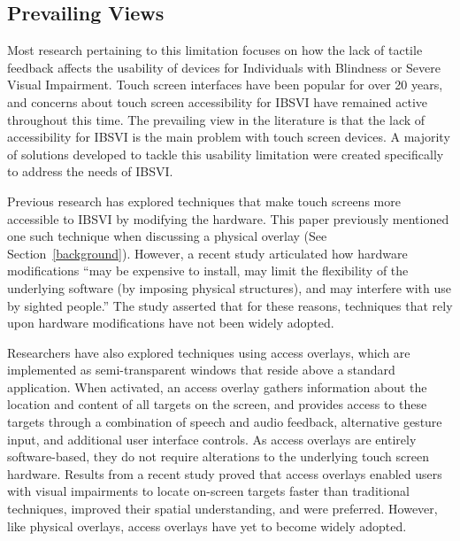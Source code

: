 \documentclass[11pt]{article}
\begin{document}
\subsection{Prevailing Views}
Most research pertaining to this limitation focuses on how the lack of tactile feedback affects the usability of devices for Individuals with Blindness or Severe Visual Impairment. Touch screen interfaces have been popular for over 20 years, and concerns about touch screen accessibility for IBSVI have remained active throughout this time. \cite{Buxton:1986:HID:22339.22386} The prevailing view in the literature is that the lack of accessibility for IBSVI is the main problem with touch screen devices.  A majority of solutions developed to tackle this usability limitation were created specifically to address the needs of IBSVI.

Previous research has explored techniques that make touch screens more accessible to IBSVI by modifying the hardware. This paper previously mentioned one such technique when discussing a physical overlay (See Section~\ref{background}).
However, a recent study articulated how hardware modifications ``may be expensive to install, may limit the flexibility of the underlying software (by imposing physical structures), and may interfere with use by sighted people.'' \cite{Kane:2011:AOI:2047196.2047232}  The study asserted that for these reasons, techniques that rely upon hardware modifications have not been widely adopted.

%

Researchers have also explored techniques using access overlays, which are implemented as semi-transparent windows that reside above a standard application. When activated, an access overlay gathers information about the location and content of all targets on the screen, and provides access to these targets through a combination of speech and audio feedback, alternative gesture input, and additional user interface controls. As access overlays are entirely software-based, they do not require alterations to the underlying touch screen hardware. Results from a recent study proved that access overlays enabled users with visual impairments to locate on-screen targets faster than traditional techniques, improved their spatial understanding, and were preferred.\cite{Kane:2011:AOI:2047196.2047232} However, like physical overlays, access overlays have yet to become widely adopted.
\end{document}
